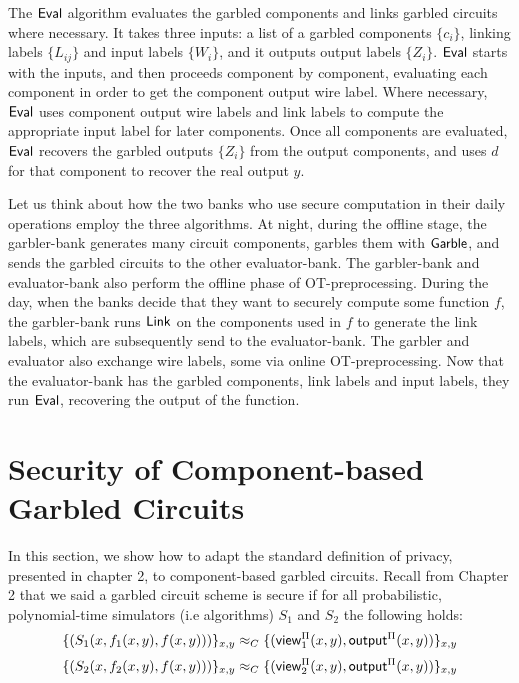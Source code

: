 The $\sf{Eval}$ algorithm evaluates the garbled components and links garbled circuits where necessary.
It takes three inputs: a list of a garbled components $\{c_i\}$, linking labels $\{L_{ij}\}$ and input labels $\{W_i\}$, and it outputs output labels $\{Z_i\}$. 
$\sf{Eval}$ starts with the inputs, and then proceeds component by component, evaluating each component in order to get the component output wire label.
Where necessary, $\sf{Eval}$ uses component output wire labels and link labels to compute the appropriate input label for later components. 
Once all components are evaluated, $\sf{Eval}$ recovers the garbled outputs $\{Z_i\}$ from the output components, and uses $d$ for that component to recover the real output $y$. 

Let us think about how the two banks who use secure computation in their daily operations employ the three algorithms.
At night, during the offline stage, the garbler-bank generates many circuit components, garbles them with $\sf{Garble}$, and sends the garbled circuits to the other evaluator-bank. 
The garbler-bank and evaluator-bank also perform the offline phase of OT-preprocessing.
During the day, when the banks decide that they want to securely compute some function $f$, the garbler-bank runs $\sf{Link}$ on the components used in $f$ to generate the link labels, which are subsequently send to the evaluator-bank.
The garbler and evaluator also exchange wire labels, some via online OT-preprocessing. 
Now that the evaluator-bank has the garbled components, link labels and input labels, they run $\sf{Eval}$, recovering the output of the function.

\section{Security of Component-based Garbled Circuits}

In this section, we show how to adapt the standard definition of privacy, presented in chapter 2, to component-based garbled circuits.
Recall from Chapter 2 that we said a garbled circuit scheme is secure if for all probabilistic, polynomial-time simulators (i.e algorithms) $S_1$ and $S_2$ the following holds:
\begin{equation}
\label{eqn:party1}
    \{(S_1(x, f_1(x,y), f(x,y)))\}_{x,y} \approx_C \{({\sf view}^{\Pi}_1(x,y), {\sf output}^{\Pi}(x,y)) \}_{x,y}
\end{equation}
\begin{equation}
\label{eqn:party2}
    \{(S_2(x, f_2(x,y), f(x,y)))\}_{x,y} \approx_C \{({\sf view}^{\Pi}_2(x,y), {\sf output}^{\Pi}(x,y)) \}_{x,y}
\end{equation}

